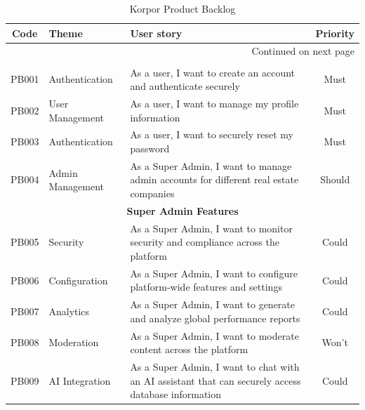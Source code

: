 \begin{longtable}{|c|l|p{8cm}|c|}
    \caption{Korpor Product Backlog\label{tab:product-backlog}} \\
        \hline
        \textbf{Code} & \textbf{Theme} & \textbf{User story} & \textbf{Priority} \\
        \hline
    \endfirsthead
    
    \hline
    \endhead
    
    \hline \multicolumn{4}{|r|}{{Continued on next page}} \\ \hline
    \endfoot
    
    \hline
    \endlastfoot
    
    \multicolumn{4}{|c|}{\cellcolor{primary!15}\textbf{\textcolor{primary}{Authentication \& User Management}}} \\
    \hline
    PB001 & Authentication & As a user, I want to create an account and authenticate securely & Must \\
    \hline
    PB002 & User Management & As a user, I want to manage my profile information & Must \\
    \hline
    PB003 & Authentication & As a user, I want to securely reset my password & Must \\
    \hline
    PB004 & Admin Management & As a Super Admin, I want to manage admin accounts for different real estate companies & Should \\
    
    
    \multicolumn{4}{|c|}{\cellcolor{primary!15}\textbf{\textcolor{primary}{Super Admin Features}}} \\
    \hline
    PB005 & Security & As a Super Admin, I want to monitor security and compliance across the platform & Could \\
    \hline
    PB006 & Configuration & As a Super Admin, I want to configure platform-wide features and settings & Could \\
    \hline
    PB007 & Analytics & As a Super Admin, I want to generate and analyze global performance reports & Could \\
    \hline
    PB008 & Moderation & As a Super Admin, I want to moderate content across the platform & Won't \\
    \hline
    PB009 & AI Integration & As a Super Admin, I want to chat with an AI assistant that can securely access database information & Could \\
    \hline
    



\end{longtable}
